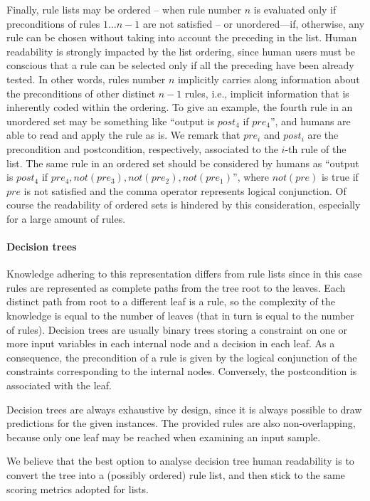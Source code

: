 \documentclass[sigconf]{acmart}
\begin{document}
Finally, rule lists may be ordered -- when rule number $n$ is evaluated only if preconditions of rules $1 \dots n-1$ are not satisfied -- or unordered---if, otherwise, any rule can be chosen without taking into account the preceding in the list.
%
Human readability is strongly impacted by the list ordering, since human users must be conscious that a rule can be selected only if all the preceding have been already tested.
%
In other words, rules number $n$ implicitly carries along information about the preconditions of other distinct $n-1$ rules, i.e., implicit information that is inherently coded within the ordering.
%
To give an example, the fourth rule in an unordered set may be something like ``output is $post_4$ if $pre_4$'', and humans are able to read and apply the rule as is.
%
We remark that $pre_i$ and $post_i$ are the precondition and postcondition, respectively, associated to the $i$-th rule of the list.
%
The same rule in an ordered set should be considered by humans as ``output is $post_4$ if $pre_4, not(pre_3), not(pre_2), not(pre_1)$'', where $not(pre)$ is true if $pre$ is not satisfied and the comma operator represents logical conjunction.
%
Of course the readability of ordered sets is hindered by this consideration, especially for a large amount of rules.

\paragraph{Decision trees}

Knowledge adhering to this representation differs from rule lists since in this case rules are represented as complete paths from the tree root to the leaves.
%
Each distinct path from root to a different leaf is a rule, so the complexity of the knowledge is equal to the number of leaves (that in turn is equal to the number of rules).
%
Decision trees are usually binary trees storing a constraint on one or more input variables in each internal node and a decision in each leaf.
%
As a consequence, the precondition of a rule is given by the logical conjunction of the constraints corresponding to the internal nodes.
%
Conversely, the postcondition is associated with the leaf.

Decision trees are always exhaustive by design, since it is always possible to draw predictions for the given instances.
%
The provided rules are also non-overlapping, because only one leaf may be reached when examining an input sample.

We believe that the best option to analyse decision tree human readability is to convert the tree into a (possibly ordered) rule list, and then stick to the same scoring metrics adopted for lists.
\end{document}
